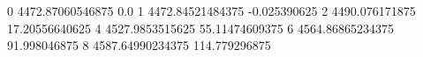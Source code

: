 0 4472.87060546875 0.0
1 4472.84521484375 -0.025390625
2 4490.076171875 17.20556640625
4 4527.9853515625 55.11474609375
6 4564.86865234375 91.998046875
8 4587.64990234375 114.779296875
